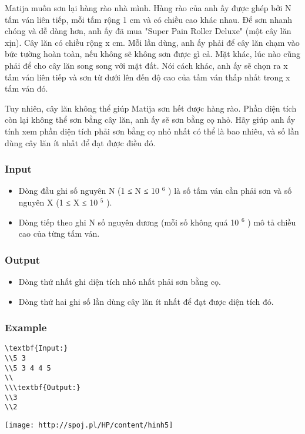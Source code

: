 



   Matija muốn sơn lại hàng rào nhà mình. Hàng rào của anh ấy được ghép bởi N tấm ván liên tiếp, mỗi tấm rộng 1 cm và có chiều cao khác nhau. Để sơn nhanh chóng và dễ dàng hơn, anh ấy đã mua "Super Pain Roller Deluxe" (một cây lăn xịn). Cây lăn có chiều rộng x cm. Mỗi lần dùng, anh ấy phải để cây lăn chạm vào bức tường hoàn toàn, nếu không sẽ không sơn được gì cả. Mặt khác, lúc nào cũng phải để cho cây lăn song song với mặt đất. Nói cách khác, anh ấy sẽ chọn ra x tấm ván liên tiếp và sơn từ dưới lên đến độ cao của tấm ván thấp nhất trong x tấm ván đó.  

   Tuy nhiên, cây lăn không thể giúp Matija sơn hết được hàng rào. Phần diện tích còn lại không thể sơn bằng cây lăn, anh ấy sẽ sơn bằng cọ nhỏ. Hãy giúp anh ấy tính xem phần diện tích phải sơn bằng cọ nhỏ nhất có thể là bao nhiêu, và số lần dùng cây lăn ít nhất để đạt được điều đó.  

\subsubsection{   Input  }
\begin{itemize}
	\item     Dòng đầu ghi số nguyên N (1 ≤ N ≤ 10    $^     6    $    ) là số tấm ván cần phải sơn và số nguyên X (1 ≤ X ≤ 10    $^     5    $    ).   
	\item     Dòng tiếp theo ghi N số nguyên dương (mỗi số không quá 10    $^     6    $    ) mô tả chiều cao của từng tấm ván.   
\end{itemize}

\subsubsection{   Output  }
\begin{itemize}
	\item     Dòng thứ nhất ghi diện tích nhỏ nhất phải sơn bằng cọ.   
	\item     Dòng thứ hai ghi số lần dùng cây lăn ít nhất để đạt được diện tích đó.   
\end{itemize}

\subsubsection{   Example  }
\begin{verbatim}
\textbf{Input:}
\\5 3
\\5 3 4 4 5
\\
\\\textbf{Output:}
\\3
\\2\end{verbatim}


\texttt{[image: http://spoj.pl/HP/content/hinh5]}